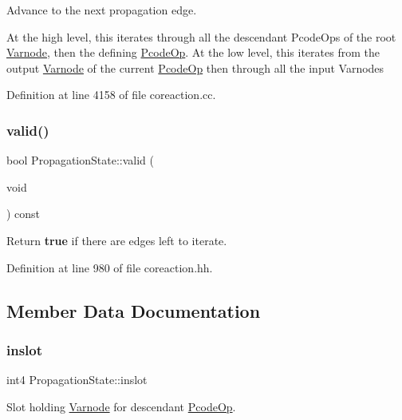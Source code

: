 Advance to the next propagation edge. 

At the high level, this iterates through all the descendant Pcode\+Ops of the root \mbox{\hyperlink{class_varnode}{Varnode}}, then the defining \mbox{\hyperlink{class_pcode_op}{Pcode\+Op}}. At the low level, this iterates from the output \mbox{\hyperlink{class_varnode}{Varnode}} of the current \mbox{\hyperlink{class_pcode_op}{Pcode\+Op}} then through all the input Varnodes 

Definition at line 4158 of file coreaction.\+cc.

\mbox{\label{class_propagation_state_af00ae2cafa9fe3527412168c94de6280}} 
\subsubsection{\texorpdfstring{valid()}{valid()}}
{\footnotesize\ttfamily bool Propagation\+State\+::valid (\begin{DoxyParamCaption}\item[{void}]{ }\end{DoxyParamCaption}) const\hspace{0.3cm}{\ttfamily [inline]}}



Return {\bfseries{true}} if there are edges left to iterate. 



Definition at line 980 of file coreaction.\+hh.



\subsection{Member Data Documentation}
\mbox{\label{class_propagation_state_a35ab65aa35ba4bad632d618d3b25d171}} 
\subsubsection{\texorpdfstring{inslot}{inslot}}
{\footnotesize\ttfamily int4 Propagation\+State\+::inslot}



Slot holding \mbox{\hyperlink{class_varnode}{Varnode}} for descendant \mbox{\hyperlink{class_pcode_op}{Pcode\+Op}}. 



